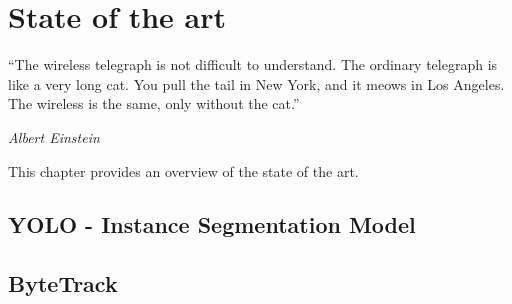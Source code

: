 \chapter{State of the art}
\label{c:sota}

\epigraph{\enquote{The wireless telegraph is not difficult to understand. The ordinary telegraph is like a very long cat. You pull the tail in New York, and it meows in Los Angeles. The wireless is the same, only without the cat.}}{\emph{Albert Einstein}}

This chapter provides an overview of the state of the art.
\section{YOLO - Instance Segmentation Model}
\label{sec:instance_segmentation}

\section{ByteTrack}
\label{sec:byte_track}

